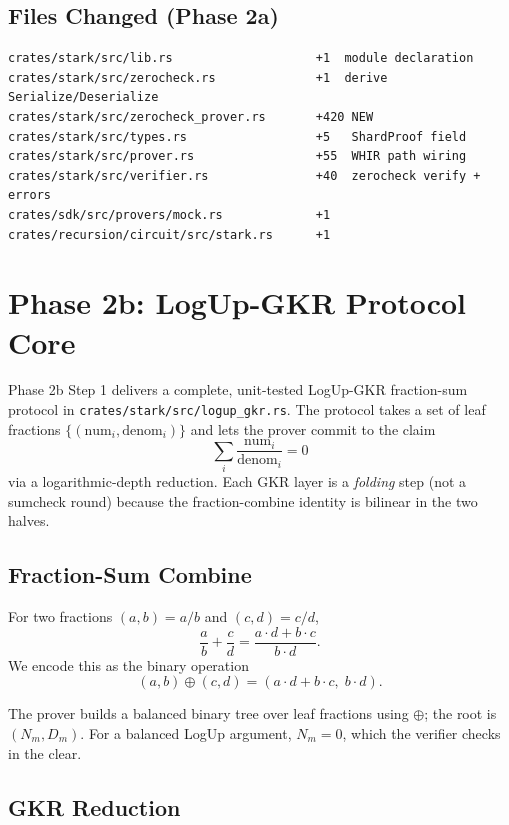 \subsection{Files Changed (Phase 2a)}

\begin{verbatim}
crates/stark/src/lib.rs                    +1  module declaration
crates/stark/src/zerocheck.rs              +1  derive Serialize/Deserialize
crates/stark/src/zerocheck_prover.rs       +420 NEW
crates/stark/src/types.rs                  +5   ShardProof field
crates/stark/src/prover.rs                 +55  WHIR path wiring
crates/stark/src/verifier.rs               +40  zerocheck verify + errors
crates/sdk/src/provers/mock.rs             +1
crates/recursion/circuit/src/stark.rs      +1
\end{verbatim}

\section{Phase 2b: LogUp-GKR Protocol Core}
\label{sec:logup-gkr-phase2b}

Phase 2b Step 1 delivers a complete, unit-tested LogUp-GKR fraction-sum
protocol in \texttt{crates/stark/src/logup\_gkr.rs}.  The protocol takes a
set of leaf fractions $\{(\text{num}_i, \text{denom}_i)\}$ and lets the
prover commit to the claim
$$\sum_i \frac{\text{num}_i}{\text{denom}_i} = 0$$
via a logarithmic-depth reduction.  Each GKR layer is a \emph{folding}
step (not a sumcheck round) because the fraction-combine identity is
bilinear in the two halves.

\subsection{Fraction-Sum Combine}

For two fractions $(a, b) = a/b$ and $(c, d) = c/d$,
$$
\frac{a}{b} + \frac{c}{d} = \frac{a \cdot d + b \cdot c}{b \cdot d}.
$$
We encode this as the binary operation
$$(a,b) \oplus (c,d) = (a \cdot d + b \cdot c,\; b \cdot d).$$

The prover builds a balanced binary tree over leaf fractions using
$\oplus$; the root is $(N_m, D_m)$.  For a balanced LogUp argument,
$N_m = 0$, which the verifier checks in the clear.

\subsection{GKR Reduction}

